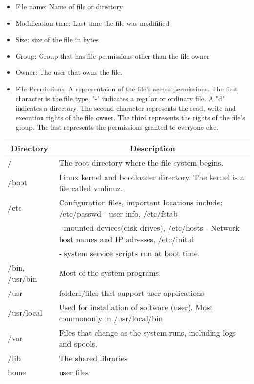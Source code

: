 \documentclass[12pt, letterpaper]{report}
\begin{document}
\begin{itemize}
	\item File name: Name of file or directory
	\item Modification time: Last time the file was modifified
	\item Size: size of the file in bytes
	\item Group: Group that has file permissions other than the file owner
	\item Owner: The user that owns the file.
	\item File Permissions: A representaion of the file's access permissions.
		The first character is the file type, "-" indicates a regular or 
		ordinary file. A "d" indicates a directory. The second character represents
		the read, write and execution rights of the file owner. The third represents 
		the rights of the file's group. The last represents the permissions granted
		to everyone else.
\end{itemize}

\begin{center}
	\begin{tabular}[c]{l|l}
		\hline
		\multicolumn{1}{c|}{\textbf{Directory}} & 
		\multicolumn{1}{c}{\textbf{Description}} \\
		\hline
		\hline
		/ & The root directory where the file system begins.\\
		\hline
		/boot & Linux kernel and bootloader directory. The kernel is a file called vmlinuz.\\
		\hline
		/etc & Configuration files, important locations include: /etc/passwd - user info, /etc/fstab \\
			 & - mounted devices(disk drives), /etc/hosts - Network host names and IP adresses, /etc/init.d \\
			 & - system service scripts run at boot time.\\
			 \hline
		/bin, /usr/bin & Most of the system programs.\\
		\hline
		/usr & folders/files that support user applications\\
		\hline
		/usr/local & Used for installation of software (user). Most commononly in /usr/local/bin\\
		\hline
		/var & Files that change as the system runs, including logs and spools.\\
		\hline
		/lib & The shared libraries\\
		\hline
		home & user files\\
		\hline
	\end{tabular}
\end{center}
\end{document}
